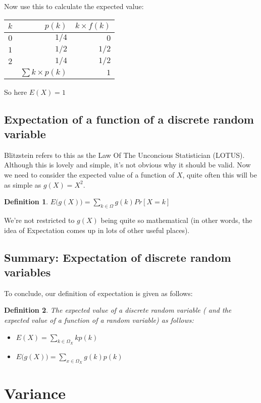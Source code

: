\documentclass[12pt]{extbook}
\newtheorem{df}{Definition}[section]
\begin{document}
Now use this to calculate the expected value:

\begin{tabular}{rrr}
$k$ & $p(k)$ & $k \times f(k)$ \\
\hline
$0$ & $1/4$ & $0$ \\
$1$ & $1/2$ & $1/2$ \\
$2$ & $1/4$ & $1/2$ \\
\hline
 & $\sum k\times p(k)$ & $1$
\end{tabular}

So here $E(X)=1$


\subsection{Expectation of a function of a discrete random variable}

Blitzstein refers to this as the Law Of The Unconcious Statistician (LOTUS).   Although this is lovely and simple, it's not obvious why it should be valid.
  Now we need to consider the expected value of a function of $X$, quite often this will be as simple as $g(X) = X^2$.

\begin{df}
$E\big( g(X) \big) = \sum_{k \in \Omega} g(k) Pr[X=k]$
\end{df}




We're not restricted to $g(X)$ being quite so mathematical (in other words, the idea of Expectation comes up in lots of other useful places).


\subsection{Summary: Expectation of discrete random variables}

To conclude, our definition of expectation is given as follows:

\begin{df}
The expected value of a discrete random variable ({\color{red} and the expected value of a \emph{function} of a random variable}) as follows:
\begin{itemize}
\item $E(X) = \sum_{k \in \Omega_X} k p(k)$
\item {\color{red}$E\big( g(X) \big) = \sum_{x \in \Omega_X} g(k) p(k)$}
\end{itemize}
\end{df}


\section{Variance}
\end{document}
